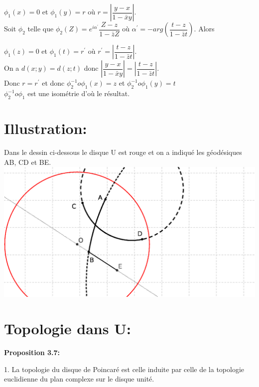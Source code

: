 \documentclass[a4paper, 12pt, twoside]{book}
\begin{document}
 $\phi_{1}(x)=0$ et $\phi_{1}(y)=r$ où $r=|\dfrac{y-x}{1-\bar{x}y}|$.\\
 
 
 Soit $\phi_{2}$ telle que $\phi_{2}(Z)=e^{i\alpha^{'}}\dfrac{Z-z}{1-\bar{z}Z}$ où $\alpha^{'}=-arg(\dfrac{t-z}{1-\bar{z}t})$. Alors\
 
 $\phi_{1}(z)=0$ et $\phi_{1}(t)=r^{'}$ où $r^{'}=|\dfrac{t-z}{1-\bar{z}t}|$.\\
 
 On a $d(x; y)=d(z; t)$ donc $|\dfrac{y-x}{1-\bar{x}y}|=|\dfrac{t-z}{1-\bar{z}t}|$.\\
 
 Donc $r=r^{'}$ et donc $\phi_{2}^{-1}o\phi_{1}(x)=z$ et $\phi_{2}^{-1}o\phi_{1}(y)=t$\\
 
$\phi_{2}^{-1}o\phi_{1}$ est une isométrie d'où le résultat.\\

\newpage \section{Illustration:}

Dans le dessin ci-dessous le disque U est rouge et on a indiqué les géodésiques AB, CD et BE.\\

\includegraphics[scale=1]{figures/poin1.eps}\\

 
  
  
  \section{Topologie dans U:}
  
  \textbf{Proposition 3.7:}
  
  1. La topologie du disque de Poincaré est celle induite par celle de la topologie euclidienne du plan complexe sur le disque unité.
  
\end{document}
